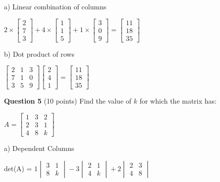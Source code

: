 \documentclass{article}
\begin{document}
a) Linear combination of columns

$2 \times \begin{bmatrix}
    2 \\ 7 \\ 3
\end{bmatrix} + 4 \times \begin{bmatrix}
    1 \\ 1 \\ 5
\end{bmatrix} + 1 \times \begin{bmatrix}
    3 \\ 0 \\ 9
\end{bmatrix} = \begin{bmatrix}
    11 \\ 18 \\ 35
\end{bmatrix}$

b) Dot product of rows

$\begin{bmatrix}
    2 & 1 & 3 \\
    7 & 1 & 0 \\
    3 & 5 & 9
\end{bmatrix}\begin{bmatrix}
    2 \\ 4 \\ 1
\end{bmatrix} = \begin{bmatrix}
    11 \\ 18 \\ 35
\end{bmatrix}$

\vspace{2em}
\noindent
\textbf{Question 5} (10 points) Find the value of $k$ for which the matrix has:

$A = \begin{bmatrix}
    1 & 3 & 2 \\
    2 & 3 & 1 \\
    4 & 8 & k
\end{bmatrix}$

a) Dependent Columns

det(A) = $1 \begin{vmatrix}
    3 & 1 \\ 8 & k
\end{vmatrix} - 3 \begin{vmatrix}
    2 & 1 \\ 4 & k
\end{vmatrix} + 2 \begin{vmatrix}
    2 & 3 \\ 4 & 8
\end{vmatrix}$
\end{document}
